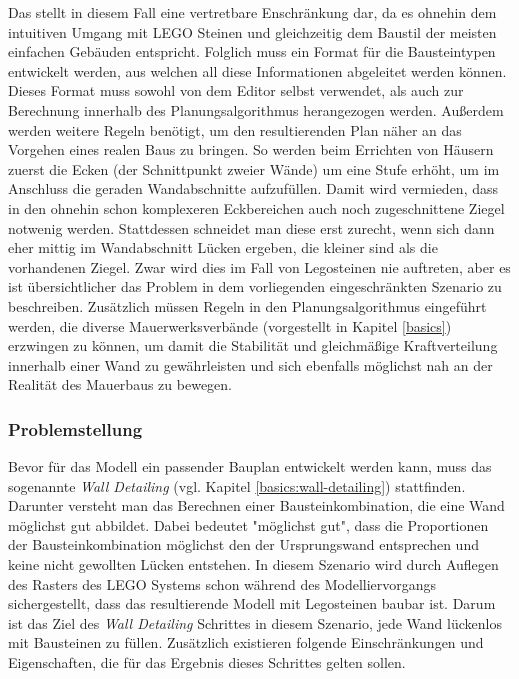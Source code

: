 Das stellt in diesem Fall eine vertretbare Enschränkung dar, da es ohnehin dem intuitiven Umgang mit LEGO Steinen und gleichzeitig dem Baustil der meisten einfachen Gebäuden entspricht.
Folglich muss ein Format für die Bausteintypen entwickelt werden, aus welchen all diese Informationen abgeleitet werden können.
Dieses Format muss sowohl von dem Editor selbst verwendet, als auch zur Berechnung innerhalb des Planungsalgorithmus herangezogen werden.
Außerdem werden weitere Regeln benötigt, um den resultierenden Plan näher an das Vorgehen eines realen Baus zu bringen.
So werden beim Errichten von Häusern zuerst die Ecken (der Schnittpunkt zweier Wände) um eine Stufe erhöht, um im Anschluss die geraden Wandabschnitte aufzufüllen.
Damit wird vermieden, dass in den ohnehin schon komplexeren Eckbereichen auch noch zugeschnittene Ziegel notwenig werden.
Stattdessen schneidet man diese erst zurecht, wenn sich dann eher mittig im Wandabschnitt Lücken ergeben, die kleiner sind als die vorhandenen Ziegel.
Zwar wird dies im Fall von Legosteinen nie auftreten, aber es ist übersichtlicher das Problem in dem vorliegenden eingeschränkten Szenario zu beschreiben.
Zusätzlich müssen Regeln in den Planungsalgorithmus eingeführt werden, die diverse Mauerwerksverbände (vorgestellt in Kapitel \ref{basics}) erzwingen zu können, um damit die Stabilität und gleichmäßige Kraftverteilung innerhalb einer Wand zu gewährleisten und sich ebenfalls möglichst nah an der Realität des Mauerbaus zu bewegen.

\subsubsection{Problemstellung}
\label{scenarios:scenario1:problem}
Bevor für das Modell ein passender Bauplan entwickelt werden kann, muss das sogenannte \textit{Wall Detailing} (vgl. Kapitel \ref{basics:wall-detailing}) stattfinden.
Darunter versteht man das Berechnen einer Bausteinkombination, die eine Wand möglichst gut abbildet.
Dabei bedeutet "möglichst gut", dass die Proportionen der Bausteinkombination möglichst den der Ursprungswand entsprechen und keine nicht gewollten Lücken entstehen.
In diesem Szenario wird durch Auflegen des Rasters des LEGO Systems schon während des Modelliervorgangs sichergestellt, dass das resultierende Modell mit Legosteinen baubar ist.
Darum ist das Ziel des \textit{Wall Detailing} Schrittes in diesem Szenario, jede Wand lückenlos mit Bausteinen zu füllen.
Zusätzlich existieren folgende Einschränkungen und Eigenschaften, die für das Ergebnis dieses Schrittes gelten sollen.

